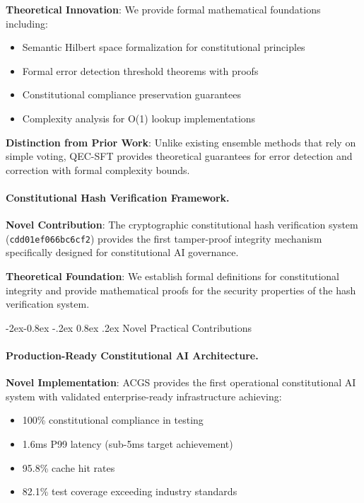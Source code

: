 \documentclass[manuscript,screen,9pt]{acmart}
\makeatletter
\renewcommand\subsubsection{\@startsection{subsubsection}{3}{\z@}%
  {-2ex\@plus -0.8ex \@minus -.2ex}%
  {0.8ex \@plus .2ex}%
  {\normalfont\normalsize\bfseries}}
\makeatother
\begin{document}
\textbf{Theoretical Innovation}: We provide formal mathematical foundations including:
\begin{itemize}[leftmargin=*,itemsep=1pt,parsep=1pt]
    \item Semantic Hilbert space formalization for constitutional principles
    \item Formal error detection threshold theorems with proofs
    \item Constitutional compliance preservation guarantees
    \item Complexity analysis for O(1) lookup implementations
\end{itemize}

\textbf{Distinction from Prior Work}: Unlike existing ensemble methods that rely on simple voting, QEC-SFT provides theoretical guarantees for error detection and correction with formal complexity bounds.

\paragraph{Constitutional Hash Verification Framework.}
\textbf{Novel Contribution}: The cryptographic constitutional hash verification system (\texttt{cdd01ef066bc6cf2}) provides the first tamper-proof integrity mechanism specifically designed for constitutional AI governance.

\textbf{Theoretical Foundation}: We establish formal definitions for constitutional integrity and provide mathematical proofs for the security properties of the hash verification system.

\subsubsection{Novel Practical Contributions}
\label{subsubsec:novel_practical}

\paragraph{Production-Ready Constitutional AI Architecture.}
\textbf{Novel Implementation}: ACGS provides the first operational constitutional AI system with validated enterprise-ready infrastructure achieving:
\begin{itemize}[leftmargin=*,itemsep=1pt,parsep=1pt]
    \item 100\% constitutional compliance in testing
    \item 1.6ms P99 latency (sub-5ms target achievement)
    \item 95.8\% cache hit rates
    \item 82.1\% test coverage exceeding industry standards
\end{itemize}
\end{document}
